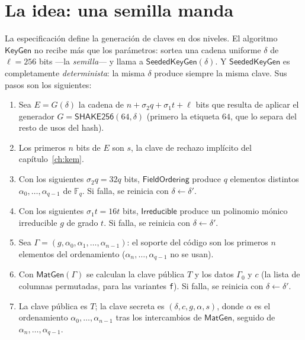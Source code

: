 \documentclass[11pt,a4paper,oneside]{report}
\newcommand{\GF}[1]{\mathbb{F}_{#1}}
\begin{document}
\section{La idea: una semilla manda}

La especificación define la generación de claves en dos niveles. El
algoritmo $\textsf{KeyGen}$ no recibe más que los parámetros: sortea una
cadena uniforme $\delta$ de $\ell=256$ bits ---la \emph{semilla}--- y
llama a $\textsf{SeededKeyGen}(\delta)$. Y $\textsf{SeededKeyGen}$ es
completamente \emph{determinista}: la misma $\delta$ produce siempre la
misma clave. Sus pasos son los siguientes:

\begin{enumerate}[leftmargin=1.8em,itemsep=3pt]
  \item Sea $E=G(\delta)$ la cadena de
        $n+\sigma_2q+\sigma_1t+\ell$ bits que resulta de aplicar el
        generador
        $G=\textsf{SHAKE256}(64,\delta)$ (primero la etiqueta $64$, que
        lo separa del resto de usos del hash).
  \item Los primeros $n$ bits de $E$ son $s$, la clave de rechazo
        implícito del capítulo~\ref{ch:kem}.
  \item Con los siguientes $\sigma_2q=32q$ bits, $\textsf{FieldOrdering}$
        produce $q$ elementos distintos
        $\alpha_0,\dots,\alpha_{q-1}$ de $\GF q$. Si falla, se
        reinicia con $\delta\leftarrow\delta'$.
  \item Con los siguientes $\sigma_1t=16t$ bits, $\textsf{Irreducible}$
        produce un polinomio mónico irreducible $g$ de grado $t$. Si
        falla, se reinicia con $\delta\leftarrow\delta'$.
  \item Sea $\Gamma=(g,\alpha_0,\alpha_1,\dots,\alpha_{n-1})$: el
        soporte del código son los primeros $n$ elementos del
        ordenamiento ($\alpha_n,\dots,\alpha_{q-1}$ no se usan).
  \item Con $\textsf{MatGen}(\Gamma)$ se calculan la clave pública $T$
        y los datos $\Gamma_0$ y $c$ (la lista de columnas permutadas,
        para las variantes \texttt{f}). Si falla, se reinicia con
        $\delta\leftarrow\delta'$.
  \item La clave pública es $T$; la clave secreta es
        $(\delta,c,g,\alpha,s)$, donde $\alpha$ es el ordenamiento
        $\alpha_0,\dots,\alpha_{n-1}$ tras los intercambios de
        $\textsf{MatGen}$, seguido de $\alpha_n,\dots,\alpha_{q-1}$.
\end{enumerate}
\end{document}
